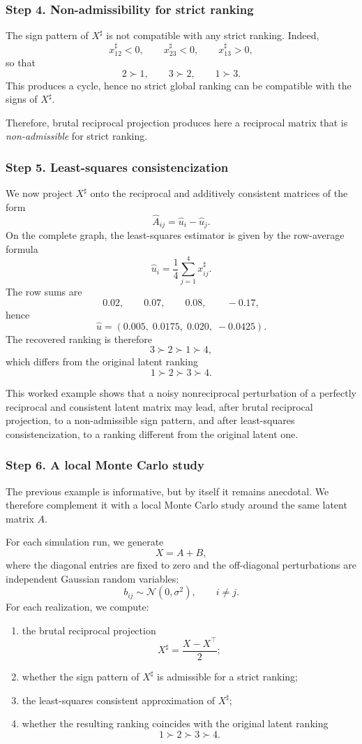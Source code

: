 \documentclass[11pt]{amsart}
\theoremstyle{definition}
\theoremstyle{plain}
\numberwithin{equation}{section}
\begin{document}
\subsubsection*{Step 4. Non-admissibility for strict ranking}

The sign pattern of $X^\sharp$ is not compatible with any strict ranking. Indeed,
\[
x^\sharp_{12}<0,\qquad x^\sharp_{23}<0,\qquad x^\sharp_{13}>0,
\]
so that
\[
2\succ 1,\qquad 3\succ 2,\qquad 1\succ 3.
\]
This produces a cycle, hence no strict global ranking can be compatible with the signs of $X^\sharp$.

Therefore, brutal reciprocal projection produces here a reciprocal matrix that is \emph{non-admissible} for strict ranking.

\subsubsection*{Step 5. Least-squares consistencization}

We now project $X^\sharp$ onto the reciprocal and additively consistent matrices of the form
\[
\widehat A_{ij}=\widehat u_i-\widehat u_j.
\]
On the complete graph, the least-squares estimator is given by the row-average formula
\[
\widehat u_i=\frac{1}{4}\sum_{j=1}^4 x^\sharp_{ij}.
\]
The row sums are
\[
0.02,\qquad 0.07,\qquad 0.08,\qquad -0.17,
\]
hence
\[
\widehat u=(0.005,\;0.0175,\;0.020,\;-0.0425).
\]
The recovered ranking is therefore
\[
3\succ 2\succ 1\succ 4,
\]
which differs from the original latent ranking
\[
1\succ 2\succ 3\succ 4.
\]

This worked example shows that a noisy nonreciprocal perturbation of a perfectly reciprocal and consistent latent matrix may lead, after brutal reciprocal projection, to a non-admissible sign pattern, and after least-squares consistencization, to a ranking different from the original latent one.

\subsubsection*{Step 6. A local Monte Carlo study}

The previous example is informative, but by itself it remains anecdotal. We therefore complement it with a local Monte Carlo study around the same latent matrix $A$.

For each simulation run, we generate
\[
X=A+B,
\]
where the diagonal entries are fixed to zero and the off-diagonal perturbations are independent Gaussian random variables:
\[
b_{ij}\sim \mathcal N(0,\sigma^2),
\qquad i\neq j.
\]
For each realization, we compute:
\begin{enumerate}
\item the brutal reciprocal projection
\[
X^\sharp=\frac{X-X^\top}{2};
\]
\item whether the sign pattern of $X^\sharp$ is admissible for a strict ranking;
\item the least-squares consistent approximation of $X^\sharp$;
\item whether the resulting ranking coincides with the original latent ranking
\[
1\succ 2\succ 3\succ 4.
\]
\end{enumerate}
\end{document}
